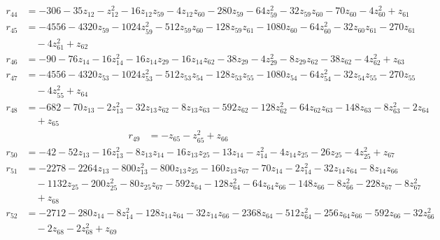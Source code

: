 \begin{align*}
r_{44} &= -306 - 35z_{12} - z_{12}^{2} - 16z_{12}z_{59} - 4z_{12}z_{60} - 280z_{59} - 64z_{59}^{2} - 32z_{59}z_{60} - 70z_{60} - 4z_{60}^{2} + z_{61}
\end{align*}
\begin{align*}
r_{45} &= -4556 - 4320z_{59} - 1024z_{59}^{2} - 512z_{59}z_{60} - 128z_{59}z_{61} - 1080z_{60} - 64z_{60}^{2} - 32z_{60}z_{61} - 270z_{61} \\
&\quad  - 4z_{61}^{2} + z_{62}
\end{align*}
\begin{align*}
r_{46} &= -90 - 76z_{14} - 16z_{14}^{2} - 16z_{14}z_{29} - 16z_{14}z_{62} - 38z_{29} - 4z_{29}^{2} - 8z_{29}z_{62} - 38z_{62} - 4z_{62}^{2} + z_{63}
\end{align*}
\begin{align*}
r_{47} &= -4556 - 4320z_{53} - 1024z_{53}^{2} - 512z_{53}z_{54} - 128z_{53}z_{55} - 1080z_{54} - 64z_{54}^{2} - 32z_{54}z_{55} - 270z_{55} \\
&\quad  - 4z_{55}^{2} + z_{64}
\end{align*}
\begin{align*}
r_{48} &= -682 - 70z_{13} - 2z_{13}^{2} - 32z_{13}z_{62} - 8z_{13}z_{63} - 592z_{62} - 128z_{62}^{2} - 64z_{62}z_{63} - 148z_{63} - 8z_{63}^{2} - 2z_{64} \\
&\quad  + z_{65}
\end{align*}
\begin{align*}
r_{49} &= -z_{65} - z_{65}^{2} + z_{66}
\end{align*}
\begin{align*}
r_{50} &= -42 - 52z_{13} - 16z_{13}^{2} - 8z_{13}z_{14} - 16z_{13}z_{25} - 13z_{14} - z_{14}^{2} - 4z_{14}z_{25} - 26z_{25} - 4z_{25}^{2} + z_{67}
\end{align*}
\begin{align*}
r_{51} &= -2278 - 2264z_{13} - 800z_{13}^{2} - 800z_{13}z_{25} - 160z_{13}z_{67} - 70z_{14} - 2z_{14}^{2} - 32z_{14}z_{64} - 8z_{14}z_{66} \\
&\quad  - 1132z_{25} - 200z_{25}^{2} - 80z_{25}z_{67} - 592z_{64} - 128z_{64}^{2} - 64z_{64}z_{66} - 148z_{66} - 8z_{66}^{2} - 228z_{67} - 8z_{67}^{2} \\
&\quad  + z_{68}
\end{align*}
\begin{align*}
r_{52} &= -2712 - 280z_{14} - 8z_{14}^{2} - 128z_{14}z_{64} - 32z_{14}z_{66} - 2368z_{64} - 512z_{64}^{2} - 256z_{64}z_{66} - 592z_{66} - 32z_{66}^{2} \\
&\quad  - 2z_{68} - 2z_{68}^{2} + z_{69}
\end{align*}
